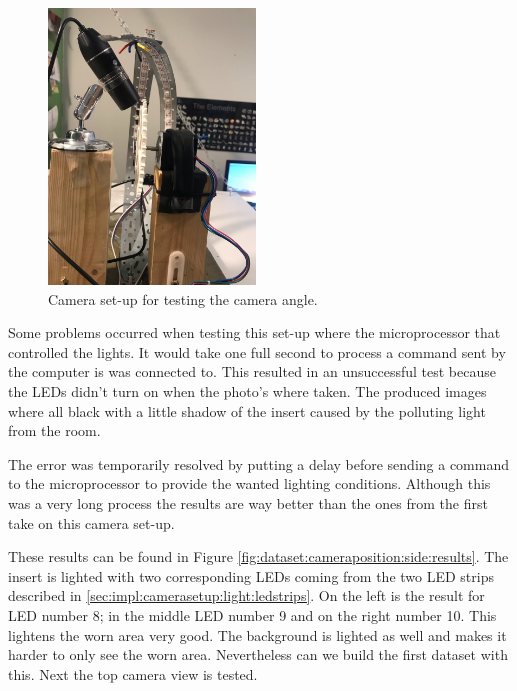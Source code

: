 		\begin{figure}[hbtp]
			\centering
			\includegraphics[width=0.49\textwidth, keepaspectratio=true,angle=270]{./fig/Vision/Dataset/automated_datasets/1_check_camera_position/1_camera_position_side/achter2.jpeg}
			\caption{Camera set-up for testing the camera angle.}
			\label{fig:dataset:cameraposition:side}
		\end{figure}

		Some problems occurred when testing this set-up where the microprocessor that controlled the lights. It would take one full second to process a command sent by the computer is was connected to. This resulted in an unsuccessful test because the LEDs didn't turn on when the photo's where taken. The produced images where all black with a little shadow of the insert caused by the polluting light from the room. 

		The error was temporarily resolved by putting a delay before sending a command to the microprocessor to provide the wanted lighting conditions. Although this was a very long process the results are way better than the ones from the first take on this camera set-up. 

		These results can be found in Figure \ref{fig:dataset:cameraposition:side:results}. The insert is lighted with two corresponding LEDs coming from the two LED strips described in \ref{sec:impl:camerasetup:light:ledstrips}. On the left is the result for LED number 8; in the middle LED number 9 and on the right number 10. This lightens the worn area very good. The background is lighted as well and makes it harder to only see the worn area. Nevertheless can we build the first dataset with this. Next the top camera view is tested.

